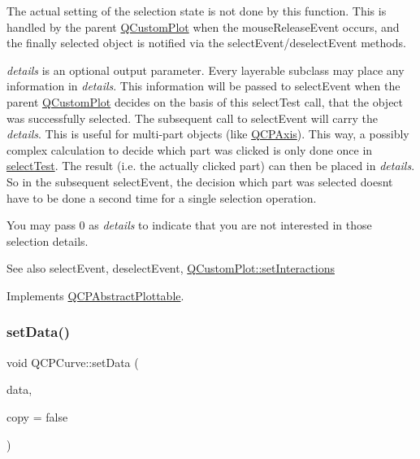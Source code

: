 The actual setting of the selection state is not done by this function. This is handled by the parent \hyperlink{class_q_custom_plot}{Q\+Custom\+Plot} when the mouse\+Release\+Event occurs, and the finally selected object is notified via the select\+Event/deselect\+Event methods.

{\itshape details} is an optional output parameter. Every layerable subclass may place any information in {\itshape details}. This information will be passed to select\+Event when the parent \hyperlink{class_q_custom_plot}{Q\+Custom\+Plot} decides on the basis of this select\+Test call, that the object was successfully selected. The subsequent call to select\+Event will carry the {\itshape details}. This is useful for multi-\/part objects (like \hyperlink{class_q_c_p_axis}{Q\+C\+P\+Axis}). This way, a possibly complex calculation to decide which part was clicked is only done once in \hyperlink{class_q_c_p_curve_a87a9fb34a2a48dcae4c1245ada235e7d}{select\+Test}. The result (i.\+e. the actually clicked part) can then be placed in {\itshape details}. So in the subsequent select\+Event, the decision which part was selected doesn\textquotesingle{}t have to be done a second time for a single selection operation.

You may pass 0 as {\itshape details} to indicate that you are not interested in those selection details.

\begin{DoxySeeAlso}{See also}
select\+Event, deselect\+Event, \hyperlink{class_q_custom_plot_a5ee1e2f6ae27419deca53e75907c27e5}{Q\+Custom\+Plot\+::set\+Interactions} 
\end{DoxySeeAlso}


Implements \hyperlink{class_q_c_p_abstract_plottable_a38efe9641d972992a3d44204bc80ec1d}{Q\+C\+P\+Abstract\+Plottable}.

\hypertarget{class_q_c_p_curve_a631ac886708460013b30052f49cbc9da}{}\label{class_q_c_p_curve_a631ac886708460013b30052f49cbc9da} 
\subsubsection{\texorpdfstring{set\+Data()}{setData()}\hspace{0.1cm}{\footnotesize\ttfamily [1/3]}}
{\footnotesize\ttfamily void Q\+C\+P\+Curve\+::set\+Data (\begin{DoxyParamCaption}\item[{\hyperlink{qcustomplot_8h_a444d37ec9cb2951b3a7fe443c34d1658}{Q\+C\+P\+Curve\+Data\+Map} $\ast$}]{data,  }\item[{bool}]{copy = {\ttfamily false} }\end{DoxyParamCaption})}

